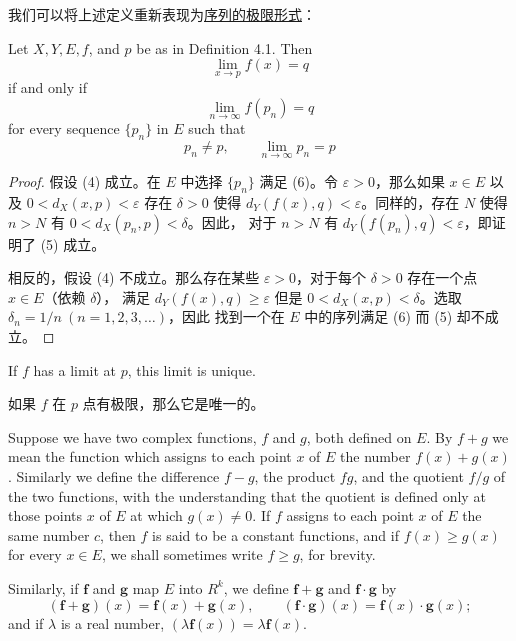 \documentclass[../poma-notes.tex]{subfiles}
\begin{document}
\newpage
我们可以将上述定义重新表现为\underline{序列的极限形式}：

\begin{theorem}
  Let $X, Y, E, f$, and $p$ be as in Definition 4.1. Then
  \begin{equation}
    \lim_{x \to p} f(x) = q
  \end{equation}
  if and only if
  \begin{equation}
    \lim_{n \to \infty} f(p_n) = q
  \end{equation}
  for every sequence $\{p_n\}$ in $E$ such that
  \begin{equation}
    p_n \ne p, \qquad \lim_{n \to \infty} p_n = p
  \end{equation}
\end{theorem}

\begin{proof}
  假设 (4) 成立。在 $E$ 中选择 $\{p_n\}$ 满足 (6)。令 $\varepsilon > 0$，那么如果 $x\in E$ 以及 $0<d_X(x,p)<\varepsilon$
  存在 $\delta > 0$ 使得 $d_Y(f(x),q)<\varepsilon$。同样的，存在 $N$ 使得 $n > N$ 有 $0<d_X(p_n,p)<\delta$。因此，
  对于 $n > N$ 有 $d_Y(f(p_n),q) < \varepsilon$，即证明了 (5) 成立。

  相反的，假设 (4) 不成立。那么存在某些 $\varepsilon > 0$，对于每个 $\delta > 0$ 存在一个点 $x \in E$（依赖 $\delta$），
  满足 $d_Y(f(x),q)\ge\varepsilon$ 但是 $0<d_X(x,p)<\delta$。选取 $\delta_n = 1/n\ (n=1,2,3,\dots)$，因此
  找到一个在 $E$ 中的序列满足 (6) 而 (5) 却不成立。
\end{proof}

\begin{corollary}
  If $f$ has a limit at $p$, this limit is unique.
\end{corollary}

\begin{anote}
  如果 $f$ 在 $p$ 点有极限，那么它是唯一的。
\end{anote}

\begin{definition}
  Suppose we have two complex functions, $f$ and $g$, both defined on $E$. By $f + g$ we mean the function which
  assigns to each point $x$ of $E$ the number $f(x) + g(x)$. Similarly we define the difference $f - g$, the
  product $fg$, and the quotient $f/g$ of the two functions, with the understanding that the quotient is defined
  only at those points $x$ of $E$ at which $g(x) \ne 0$. If $f$ assigns to each point $x$ of $E$ the same number
  $c$, then $f$ is said to be a constant functions, and if $f(x) \ge g(x)$ for every $x \in E$, we shall sometimes
  write $f \ge g$, for brevity.

  Similarly, if $\mathbf{f}$ and $\mathbf{g}$ map $E$ into $R^k$, we define $\mathbf{f}+\mathbf{g}$ and
  $\mathbf{f}\cdot\mathbf{g}$ by
  \[
    (\mathbf{f}+\mathbf{g})(x)=\mathbf{f}(x)+\mathbf{g}(x),\qquad
    (\mathbf{f}\cdot\mathbf{g})(x)=\mathbf{f}(x)\cdot\mathbf{g}(x);
  \]
  and if $\lambda$ is a real number, $(\lambda\mathbf{f}(x))=\lambda\mathbf{f}(x)$.
\end{definition}
\end{document}
